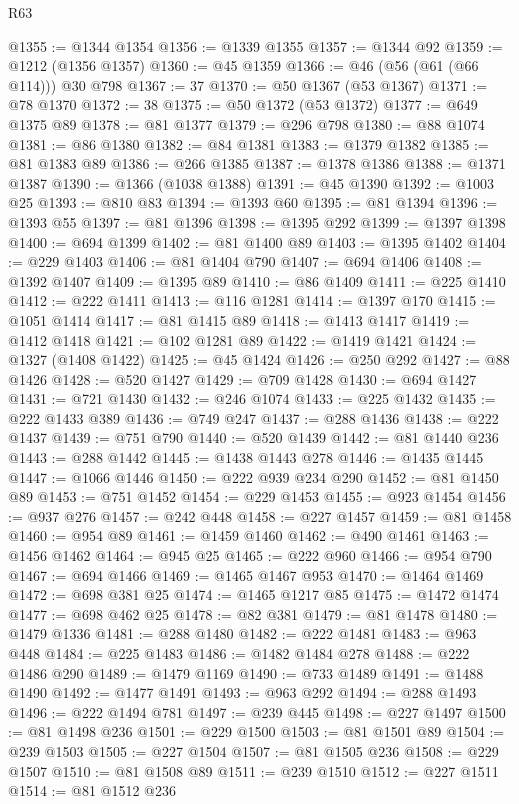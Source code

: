 \begin{lexlean}{R63}
\begin{coremodule}
@1355 := @1344 @1354
@1356 := @1339 @1355
@1357 := @1344 @92
@1359 := @1212 (@1356 @1357)
@1360 := @45 @1359
@1366 := @46 (@56 (@61 (@66 @114))) @30 @798
@1367 := 37
@1370 := @50 @1367 (@53 @1367)
@1371 := @78 @1370
@1372 := 38
@1375 := @50 @1372 (@53 @1372)
@1377 := @649 @1375 @89
@1378 := @81 @1377
@1379 := @296 @798
@1380 := @88 @1074
@1381 := @86 @1380
@1382 := @84 @1381
@1383 := @1379 @1382
@1385 := @81 @1383 @89
@1386 := @266 @1385
@1387 := @1378 @1386
@1388 := @1371 @1387
@1390 := @1366 (@1038 @1388)
@1391 := @45 @1390
@1392 := @1003 @25
@1393 := @810 @83
@1394 := @1393 @60
@1395 := @81 @1394
@1396 := @1393 @55
@1397 := @81 @1396
@1398 := @1395 @292
@1399 := @1397 @1398
@1400 := @694 @1399
@1402 := @81 @1400 @89
@1403 := @1395 @1402
@1404 := @229 @1403
@1406 := @81 @1404 @790
@1407 := @694 @1406
@1408 := @1392 @1407
@1409 := @1395 @89
@1410 := @86 @1409
@1411 := @225 @1410
@1412 := @222 @1411
@1413 := @116 @1281
@1414 := @1397 @170
@1415 := @1051 @1414
@1417 := @81 @1415 @89
@1418 := @1413 @1417
@1419 := @1412 @1418
@1421 := @102 @1281 @89
@1422 := @1419 @1421
@1424 := @1327 (@1408 @1422)
@1425 := @45 @1424
@1426 := @250 @292
@1427 := @88 @1426
@1428 := @520 @1427
@1429 := @709 @1428
@1430 := @694 @1427
@1431 := @721 @1430
@1432 := @246 @1074
@1433 := @225 @1432
@1435 := @222 @1433 @389
@1436 := @749 @247
@1437 := @288 @1436
@1438 := @222 @1437
@1439 := @751 @790
@1440 := @520 @1439
@1442 := @81 @1440 @236
@1443 := @288 @1442
@1445 := @1438 @1443 @278
@1446 := @1435 @1445
@1447 := @1066 @1446
@1450 := @222 @939 @234 @290
@1452 := @81 @1450 @89
@1453 := @751 @1452
@1454 := @229 @1453
@1455 := @923 @1454
@1456 := @937 @276
@1457 := @242 @448
@1458 := @227 @1457
@1459 := @81 @1458
@1460 := @954 @89
@1461 := @1459 @1460
@1462 := @490 @1461
@1463 := @1456 @1462
@1464 := @945 @25
@1465 := @222 @960
@1466 := @954 @790
@1467 := @694 @1466
@1469 := @1465 @1467 @953
@1470 := @1464 @1469
@1472 := @698 @381 @25
@1474 := @1465 @1217 @85
@1475 := @1472 @1474
@1477 := @698 @462 @25
@1478 := @82 @381
@1479 := @81 @1478
@1480 := @1479 @1336
@1481 := @288 @1480
@1482 := @222 @1481
@1483 := @963 @448
@1484 := @225 @1483
@1486 := @1482 @1484 @278
@1488 := @222 @1486 @290
@1489 := @1479 @1169
@1490 := @733 @1489
@1491 := @1488 @1490
@1492 := @1477 @1491
@1493 := @963 @292
@1494 := @288 @1493
@1496 := @222 @1494 @781
@1497 := @239 @445
@1498 := @227 @1497
@1500 := @81 @1498 @236
@1501 := @229 @1500
@1503 := @81 @1501 @89
@1504 := @239 @1503
@1505 := @227 @1504
@1507 := @81 @1505 @236
@1508 := @229 @1507
@1510 := @81 @1508 @89
@1511 := @239 @1510
@1512 := @227 @1511
@1514 := @81 @1512 @236

\end{coremodule}
\end{lexlean}
